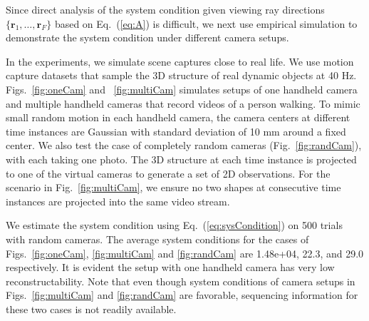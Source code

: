 Since direct analysis of the system condition given viewing ray directions $\{\mathbf{r}_1,\dots,\mathbf{r}_F\}$ based on Eq.~(\ref{eq:A}) is difficult, we next use empirical simulation to demonstrate the system condition under different camera setups. %

In the experiments, we simulate scene captures close to real life.
We use motion capture datasets that sample the 3D structure of real dynamic objects at 40 Hz. 
Figs.~\ref{fig:oneCam} and ~\ref{fig:multiCam} simulates setups of one handheld camera and multiple handheld cameras that record videos of a person walking. 
To mimic small random motion in each handheld camera, 
the camera centers at different time instances are Gaussian with standard deviation of 10 mm around a fixed center. 
We also test the case of completely random cameras (Fig.~\ref{fig:randCam}), with each taking one photo. %
The 3D structure at each time instance is projected to one of the virtual cameras to generate a set of 2D observations. For the scenario in Fig.~\ref{fig:multiCam}, we ensure no two shapes at consecutive time instances are projected into the same video stream.

We estimate the system condition using Eq.~(\ref{eq:sysCondition}) on 500 trials with random cameras. 
The average system conditions for the cases of Figs.~\ref{fig:oneCam}, \ref{fig:multiCam} and \ref{fig:randCam} are 1.48e+04, 22.3, and 29.0 respectively. It is evident the setup with one handheld camera has very low reconstructability.
Note that even though system conditions of camera setups in Figs.~\ref{fig:multiCam} and \ref{fig:randCam} are favorable, sequencing information for these two cases is not readily available.

